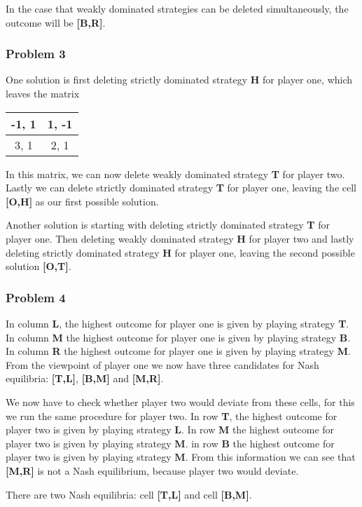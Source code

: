 \documentclass[]{article}
\begin{document}
In the case that weakly dominated strategies can be deleted simultaneously, the outcome will be \textbf{[B,R]}.
\subsubsection{Problem 3}\label{problem-3}

One solution is first deleting strictly dominated strategy \textbf{H} for
player one, which leaves the matrix

\begin{tabular}{| c | c |}
  \hline			
  -1, 1 &  1, -1 \\
\hline
  3, 1 & 2, 1 \\
  \hline  
\end{tabular}

In this matrix, we can now delete weakly dominated strategy \textbf{T} for
player two. Lastly we can delete strictly dominated strategy \textbf{T}
for player one, leaving the cell \textbf{[O,H]} as our first possible
solution.

Another solution is starting with deleting strictly dominated strategy
\textbf{T} for player one. Then deleting weakly dominated strategy
\textbf{H} for player two and lastly deleting strictly dominated strategy
\textbf{H} for player one, leaving the second possible solution \textbf{[O,T]}.

\subsubsection{Problem 4}\label{problem-4}

In column \textbf{L}, the highest outcome for player one is given by
playing strategy \textbf{T}. In column \textbf{M} the highest outcome for
player one is given by playing strategy \textbf{B}. In column \textbf{R} the
highest outcome for player one is given by playing strategy \textbf{M}.
From the viewpoint of player one we now have three candidates for Nash
equilibria: \textbf{[T,L]}, \textbf{[B,M]} and \textbf{[M,R]}.\strut

We now have to check whether player two would deviate from these cells,
for this we run the same procedure for player two. In row \textbf{T}, the
highest outcome for player two is given by playing strategy \textbf{L}. In
row \textbf{M} the highest outcome for player two is given by playing
strategy \textbf{M}. in row \textbf{B} the highest outcome for player two is
given by playing strategy \textbf{M}. From this information we can see
that \textbf{[M,R]} is not a Nash equilibrium, because player two would
deviate.\strut
There are two Nash equilibria: cell \textbf{[T,L]} and cell \textbf{[B,M]}.\strut
\end{document}
